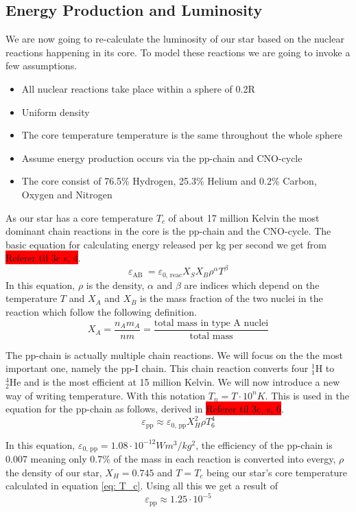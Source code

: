 \documentclass[reprint,english,notitlepage]{revtex4-2}
\begin{document}
\subsection{Energy Production and Luminosity}
We are now going to re-calculate the luminosity of our star based on the nuclear reactions happening in its core. To model these reactions we are going to invoke a few assumptions. 
\begin{itemize}
  \item All nuclear reactions take place within a sphere of 0.2R 
  \item Uniform density
  \item The core temperature temperature is the same throughout the whole sphere
  \item Assume energy production occurs via the pp-chain and CNO-cycle
  \item The core consist of 76.5\% Hydrogen, 25.3\% Helium and 0.2\% Carbon, Oxygen and Nitrogen 
\end{itemize}
As our star has a core temperature $ T_c $ of about 17 million Kelvin the most dominant chain reactions in the core is the pp-chain and the CNO-cycle. The basic equation for calculating energy released per kg per second we get from \colorbox{red}{Referer til 3c s, 4}. 
\begin{equation}\label{eq: chain reaction}
  ε_{\text{AB }} = ε_{\text{0, reac}} X_{S} X_{B} ρ^{α} T^{β}
\end{equation}
In this equation, $ ρ $ is the density, $ α $ and $ β $ are indices which depend on the temperature $ T $ and $ X_{A} $ and $ X_{B} $ is the mass fraction of the two nuclei in the reaction which follow the following definition. 
\[
X_{A} = \frac{n_{A}m_{A}}{nm} = \frac{\text{total mass in type A nuclei}}{\text{total mass}}
\]

The pp-chain is actually multiple chain reactions. We will focus on the the most important one, namely the pp-I chain. This chain reaction converts four $ _{1}^{1}\text{H} $ to $ _{2}^{4}\text{He} $ and is the most efficient at 15 million Kelvin. We will now introduce a new way of writing temperature. With this notation $ T_{n} = T ⋅ 10^{n}K $. This is used in the equation for the pp-chain as follows, derived in \colorbox{red}{Referer til 3c, s, 6}. 
\begin{equation}\label{eq: pp-chain}
  ε_{\text{pp}} ≈ ε_{\text{0, pp}}X^{2}_{H}ρ T^{4}_{6}
\end{equation}

In this equation, $ ε_{\text{0, pp}} = 1.08 ⋅ 10^{-12}Wm^{3} / kg^{2} $, the efficiency of the pp-chain is 0.007 meaning only 0.7\% of the mass in each reaction is converted into evergy, $ ρ $ the density of our star, $ X_{H} = 0.745$ and $ T = T_c $ being our star's core temperature calculated in equation \ref{eq: T_c}. Using all this we get a result of 
\begin{equation}\label{eq: E_pp}
  ε_{\text{pp}} ≈ 1.25 ⋅ 10^{-5}
\end{equation}
\end{document}

